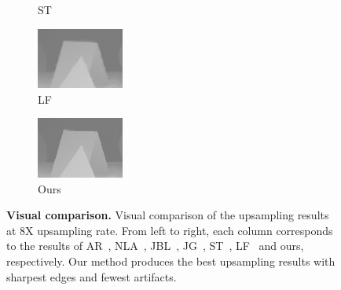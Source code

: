 \documentclass[preprint,10pt,5p,times,twocolumn]{elsarticle}
\begin{document}
\begin{figure}[t]
\begin{center}
\begin{subfigure}[b]{0.136\linewidth}
    \caption{ST~\cite{Choi_TIP_2014}}
    \label{fig:ST}
\end{subfigure}
\begin{subfigure}[b]{0.136\linewidth}
    \includegraphics[height = 2cm,width=\linewidth]{cmp_moebius_8X_LF_part.png}
    \caption{LF~\cite{Kang_ET_2014}}
    \label{fig:LF} %
\end{subfigure}
\begin{subfigure}[b]{0.136\linewidth}
    \includegraphics[height = 2cm,width=\linewidth]{cmp_moebius_8X_MST_part.png}
    \caption{Ours}
    \label{fig:ours} %
\end{subfigure}
\end{center}
\caption{\textbf{Visual comparison.} Visual comparison of the upsampling results at 8X upsampling rate. From left to right, each column corresponds to the results of AR~\cite{YangJingyu2012}, NLA~\cite{Yang2012}, JBL~\cite{Kopf2007}, JG~\cite{Liu2013}, ST~\cite{Choi_TIP_2014}, LF~\cite{Kang_ET_2014} and ours, respectively. Our method produces the best upsampling results with sharpest edges and fewest artifacts. }
\label{fig:comparison}
\end{figure}
\end{document}

